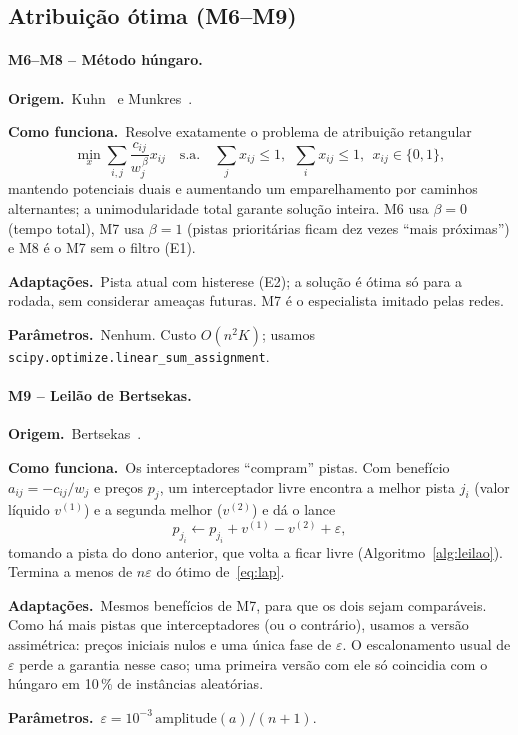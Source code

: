\documentclass[11pt,a4paper]{article}
\newcommand{\orig}{\par\noindent\textbf{Origem.}~}
\newcommand{\func}{\par\noindent\textbf{Como funciona.}~}
\newcommand{\adap}{\par\noindent\textbf{Adaptações.}~}
\newcommand{\parm}{\par\noindent\textbf{Parâmetros.}~}
\begin{document}
\subsection{Atribuição ótima (M6--M9)}

\paragraph{M6--M8 -- Método húngaro.}
\orig Kuhn~\cite{kuhn1955} e Munkres~\cite{munkres1957}.
\func Resolve exatamente o problema de atribuição retangular
\begin{equation}
  \min_{x}\sum_{i,j}\frac{c_{ij}}{w_j^{\,\beta}}x_{ij}\quad\text{s.a.}\quad
  \sum_j x_{ij}\le1,\ \ \sum_i x_{ij}\le1,\ \ x_{ij}\in\{0,1\},
  \label{eq:lap}
\end{equation}
mantendo potenciais duais e aumentando um emparelhamento por caminhos alternantes; a unimodularidade total garante
solução inteira. M6 usa $\beta=0$ (tempo total), M7 usa $\beta=1$ (pistas prioritárias ficam dez vezes ``mais
próximas'') e M8 é o M7 sem o filtro (E1).
\adap Pista atual com histerese (E2); a solução é ótima só para a rodada, sem considerar ameaças futuras. M7 é o
especialista imitado pelas redes.
\parm Nenhum. Custo $O(n^2K)$; usamos \texttt{scipy.optimize.linear\_sum\_assignment}.

\paragraph{M9 -- Leilão de Bertsekas.}
\orig Bertsekas~\cite{bertsekas1988}.
\func Os interceptadores ``compram'' pistas. Com benefício $a_{ij}=-c_{ij}/w_j$ e preços $p_j$, um interceptador livre
encontra a melhor pista $j_i$ (valor líquido $v^{(1)}$) e a segunda melhor ($v^{(2)}$) e dá o lance
\begin{equation}
  p_{j_i}\leftarrow p_{j_i}+v^{(1)}-v^{(2)}+\varepsilon,
  \label{eq:lance}
\end{equation}
tomando a pista do dono anterior, que volta a ficar livre (Algoritmo~\ref{alg:leilao}). Termina a menos de
$n\varepsilon$ do ótimo de~\eqref{eq:lap}.
\adap Mesmos benefícios de M7, para que os dois sejam comparáveis. Como há mais pistas que interceptadores (ou o
contrário), usamos a versão assimétrica: preços iniciais nulos e uma única fase de $\varepsilon$. O escalonamento usual de
$\varepsilon$ perde a garantia nesse caso; uma primeira versão com ele só coincidia com o húngaro em 10\,\% de instâncias
aleatórias.
\parm $\varepsilon=10^{-3}\,\mathrm{amplitude}(a)/(n+1)$.
\end{document}
